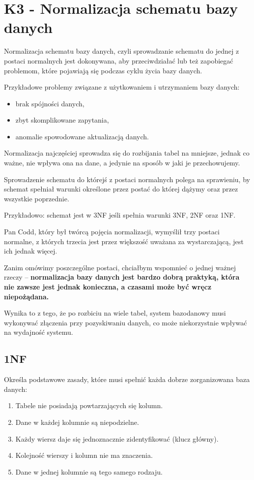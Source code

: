 \section{K3 - Normalizacja schematu bazy danych}

Normalizacja schematu bazy danych, czyli sprowadzanie schematu do jednej z postaci normalnych jest dokonywana, aby przeciwdziałać lub też zapobiegać problemom, które pojawiają się podczas cyklu życia bazy danych.

Przykładowe problemy związane z użytkowaniem i utrzymaniem bazy danych:
\begin{itemize}
	\item{brak spójności danych,}
	\item{zbyt skomplikowane zapytania,}
	\item{anomalie spowodowane aktualizacją danych.}
\end{itemize}

Normalizacja najczęściej sprowadza się do rozbijania tabel na mniejsze, jednak co ważne, nie wpływa ona na dane, a jedynie na sposób w jaki je przechowujemy.

Sprowadzenie schematu do którejś z postaci normalnych polega na sprawieniu, by schemat spełniał warunki określone przez postać do której dążymy oraz przez wszystkie poprzednie.

Przykładowo: schemat jest w 3NF jeśli spełnia warunki 3NF, 2NF oraz 1NF.

Pan Codd, który był twórcą pojęcia normalizacji, wymyślił trzy postaci normalne, z których trzecia jest przez większość uważana za wystarczającą, jest ich jednak więcej.

Zanim omówimy poszczególne postaci, chciałbym wspomnieć o jednej ważnej rzeczy -- \textbf{normalizacja bazy danych jest bardzo dobrą praktyką, która nie zawsze jest jednak konieczna, a czasami może być wręcz niepożądana.}

Wynika to z tego, że po rozbiciu na wiele tabel, system bazodanowy musi wykonywać złączenia przy pozyskiwaniu danych, co może niekorzystnie wpływać na wydajność systemu.
\subsection*{1NF}
	Określa podstawowe zasady, które musi spełnić każda dobrze zorganizowana baza danych:
\begin{enumerate}
	\item{Tabele nie posiadają powtarzających się kolumn.}
	\item{Dane w każdej kolumnie są niepodzielne.}
	\item{Każdy wiersz daje się jednoznacznie zidentyfikować (klucz główny).}
	\item{Kolejność wierszy i kolumn nie ma znaczenia.}
	\item{Dane w jednej kolumnie są tego samego rodzaju.}
\end{enumerate}

